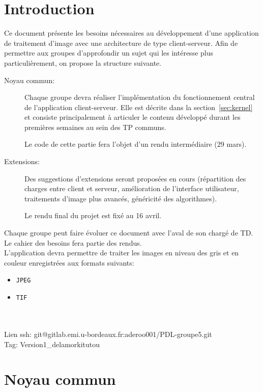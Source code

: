 \documentclass[a4paper,12pt]{article}
\newcounter{besoin}
\begin{document}
    \section{Introduction}

    Ce document présente les besoins nécessaires au développement d'une application
    de traitement d'image avec une architecture de type client-serveur.
    Afin de permettre aux groupes d'approfondir un sujet qui les intéresse plus
    particulièrement, on propose la structure suivante.

    \begin{description}
        \item[Noyau commun:] Chaque groupe devra réaliser l'implémentation du fonctionnement central de l'application client-serveur. Elle est décrite dans la section~\ref{sec:kernel} et consiste principalement à articuler le contenu développé durant les premières semaines au sein des TP communs.

        Le code de cette partie fera l'objet d'un rendu intermédiaire (29 mars).

        \item [Extensions: ] Des suggestions d'extensions seront proposées en cours (répartition des charges entre client et serveur, amélioration de l'interface utilisateur, traitements d'image plus avancés, généricité des algorithmes).

        Le rendu final du projet est fixé au 16 avril.

    \end{description}


    Chaque groupe peut faire évoluer ce document avec l'aval de son chargé de TD. Le cahier des besoins fera partie des rendus.\\


    L'application devra permettre de traiter les images en niveau des gris et en
    couleur enregistrées aux formats suivants:

    \begin{itemize}
        \item \verb!JPEG!
        \item \verb!TIF!
    \end{itemize}\\
    \\
    Lien ssh: git@gitlab.emi.u-bordeaux.fr:aderoo001/PDL-groupe5.git\\
    Tag: Version1\_delamorkitutou\\


    \section{\label{sec:kernel}Noyau commun}
\end{document}
